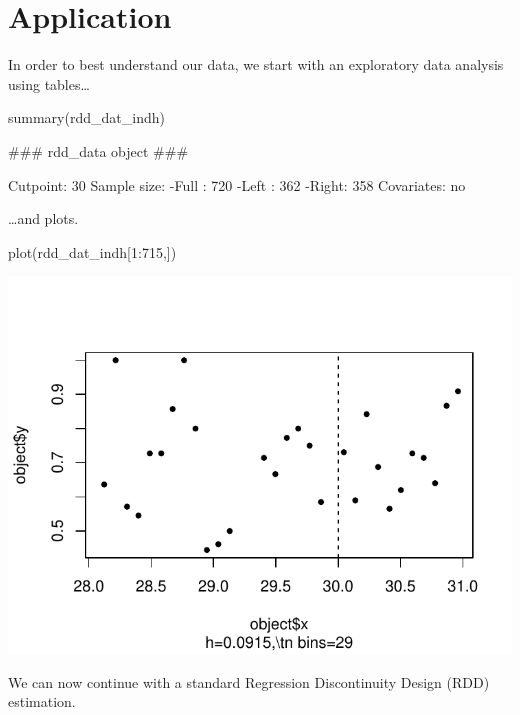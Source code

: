 \documentclass[article]{jss}
\begin{document}
\section{Application}\label{application}

In order to best understand our data, we start with an exploratory data
analysis using tables\ldots{}

\begin{CodeChunk}
\begin{CodeInput}
summary(rdd_dat_indh)
\end{CodeInput}
\begin{CodeOutput}
### rdd_data object ###

Cutpoint: 30 
Sample size: 
    -Full : 720 
    -Left : 362 
    -Right: 358
Covariates: no 
\end{CodeOutput}
\end{CodeChunk}

\ldots{}and plots.

\begin{CodeChunk}
\begin{CodeInput}
plot(rdd_dat_indh[1:715,])
\end{CodeInput}


\begin{center}\includegraphics{README_files/figure-latex/unnamed-chunk-7-1} \end{center}

\end{CodeChunk}

We can now continue with a standard Regression Discontinuity Design
(RDD) estimation.
\end{document}
